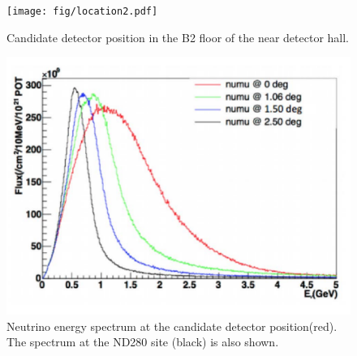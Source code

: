 \begin{figure}[tbh]
\begin{center}
\texttt{[image: fig/location2.pdf]}
\end{center}
\caption{
Candidate detector position in the B2 floor of the near detector hall.
}
\label{fig:location}
\end{figure}

\begin{figure}[tbh]
\begin{center}
\includegraphics[width=0.6\linewidth]{fig/fluxes.pdf}
\end{center}
\caption{
Neutrino energy spectrum at the candidate detector position(red).
The spectrum at the ND280 site (black) is also shown.
}
\label{fig:b2flux}
\end{figure}




